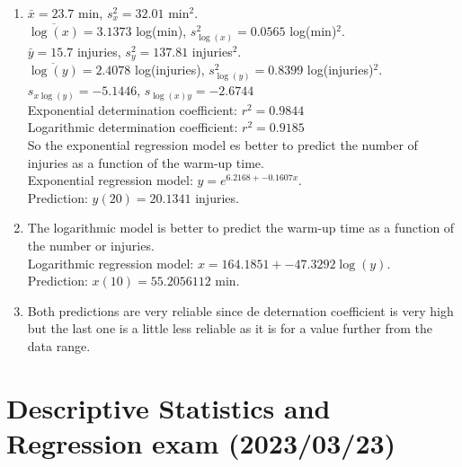 \documentclass[
  a4paper,
]{scrreport}
\theoremstyle{definition}
\theoremstyle{remark}
\begin{document}
\begin{tcolorbox}
\begin{enumerate}
\def\labelenumi{\alph{enumi}.}
\item
  \(\bar x=23.7\) min, \(s_x^2=32.01\) min\(^2\).\\
  \(\overline{\log(x)}=3.1373\) log(min), \(s_{\log(x)}^2=0.0565\)
  log(min)\(^2\).\\
  \(\bar y=15.7\) injuries, \(s_y^2=137.81\) injuries\(^2\).\\
  \(\overline{\log(y)}=2.4078\) log(injuries), \(s_{\log(y)}^2=0.8399\)
  log(injuries)\(^2\).\\
  \(s_{x\log(y)}=-5.1446\), \(s_{\log(x)y}=-2.6744\)\\
  Exponential determination coefficient: \(r^2=0.9844\)\\
  Logarithmic determination coefficient: \(r^2=0.9185\)\\
  So the exponential regression model es better to predict the number of
  injuries as a function of the warm-up time.\\
  Exponential regression model: \(y=e^{6.2168+-0.1607x}\).\\
  Prediction: \(y(20)=20.1341\) injuries.
\item
  The logarithmic model is better to predict the warm-up time as a
  function of the number or injuries.\\
  Logarithmic regression model: \(x=164.1851+-47.3292\log(y)\).\\
  Prediction: \(x(10)=55.2056112\) min.
\item
  Both predictions are very reliable since de deternation coefficient is
  very high but the last one is a little less reliable as it is for a
  value further from the data range.
\end{enumerate}

\end{tcolorbox}


\hypertarget{descriptive-statistics-and-regression-exam-20230323}{%
\chapter{Descriptive Statistics and Regression exam
(2023/03/23)}\label{descriptive-statistics-and-regression-exam-20230323}}
\end{document}
